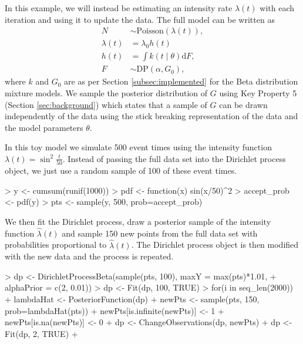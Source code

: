 \documentclass[nojss]{jss}
\begin{document}
In this example, we will instead be estimating an intensity rate $\lambda (t)$ with each iteration and using it to update the data. The full model can be written as
\begin{align*}
N & \sim \text{Poisson} ( \lambda (t) ), \\
\lambda (t) & = \lambda _0 h(t) \\
h (t) & = \int k(t \mid \theta) \mathrm{d}F, \\
F & \sim \text{DP} (\alpha , G_0),
\end{align*}
where $k$ and $G_0$ are as per Section \ref{subsec:implemented} for the Beta distribution mixture models. We sample the posterior distribution of $G$ using Key Property 5 (Section \ref{sec:background}) which states that a sample of $G$ can be drawn independently of the data using the stick breaking representation of the data and the model parameters $\theta$.

In this toy model we simulate 500 event times using the intensity function $\lambda (t) = \sin ^2 \frac{t}{50}$. Instead of passing the full data set into the Dirichlet process object, we just use a random sample of 100 of these event times.

\begin{Schunk}
\begin{Sinput}
> y <- cumsum(runif(1000))
> pdf <- function(x) sin(x/50)^2
> accept_prob <- pdf(y)
> pts <- sample(y, 500, prob=accept_prob)
\end{Sinput}
\end{Schunk}

We then fit the Dirichlet process, draw a posterior sample of the intensity function $\hat{\lambda} (t)$ and sample 150 new points from the full data set with probabilities proportional to $\hat{\lambda} (t)$. The Dirichlet process object is then modified with the new data and the process is repeated.

\begin{Schunk}
\begin{Sinput}
> dp <- DirichletProcessBeta(sample(pts, 100), maxY = max(pts)*1.01,
+ alphaPrior = c(2, 0.01))
> dp <- Fit(dp, 100, TRUE)
> for(i in seq_len(2000)){
+   lambdaHat <- PosteriorFunction(dp)
+   newPts <- sample(pts, 150, prob=lambdaHat(pts))
+   newPts[is.infinite(newPts)] <- 1
+   newPts[is.na(newPts)] <- 0
+   dp <- ChangeObservations(dp, newPts)
+   dp <- Fit(dp, 2, TRUE)
+ }
\end{Sinput}
\end{Schunk}
\end{document}
